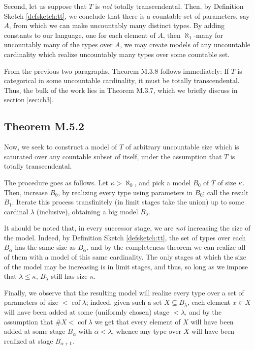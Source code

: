\documentclass{article}
\theoremstyle{nonumberplain}
\DeclareMathOperator{\cof}{cof}
\newcommand{\card}[1]{\#{#1}}
\begin{document}
Second, let us suppose that $T$ is \emph{not} totally transcendental. Then, by Definition Sketch \ref{defsketch:tt}, we conclude that there is a countable set of parameters, say $A$, from which we can make uncountably many distinct types. By adding constants to our language, one for each element of $A$, then $\aleph_1$-many for uncountably many of the types over $A$, we may create models of any uncountable cardinality which realize uncountably many types over some countable set.

From the previous two paragraphs, Theorem M.3.8 follows immediately: If $T$ is categorical in some uncountable cardinality, it must be totally transcendental. Thus, the bulk of the work lies in Theorem M.3.7, which we briefly discuss in section \ref{sec:ch3}.

\subsection{Theorem M.5.2}

Now, we seek to construct a model of $T$ of arbitrary uncountable size which is saturated over any countable subset of itself, under the assumption that $T$ is totally transcendental.

The procedure goes as follows. Let $\kappa > \aleph_0$, and pick a model $B_0$ of $T$ of size $\kappa$. Then, increase $B_0$, by realizing every type using parameters in $B_0$; call the result $B_1$. Iterate this process transfinitely (in limit stages take the union) up to some cardinal $\lambda$ (inclusive), obtaining a big model $B_\lambda$.

It should be noted that, in every successor stage, we are \emph{not} increasing the size of the model. Indeed, by Definition Sketch \ref{defsketch:tt}, the set of types over each $B_\alpha$ has the same size as $B_\alpha$, and by the completeness theorem we can realize all of them with a model of this same cardinality. The only stages at which the size of the model may be increasing is in limit stages, and thus, so long as we impose that $\lambda \leq \kappa$, $B_\lambda$ still has size $\kappa$.

Finally, we observe that the resulting model will realize every type over a set of parameters of size $<\cof\lambda$; indeed, given such a set $X \subseteq B_\lambda$, each element $x \in X$ will have been added at some (uniformly chosen) stage $<\lambda$, and by the assumption that $\card X < \cof \lambda$ we get that every element of $X$ will have been added at some stage $B_\alpha$ with $\alpha < \lambda$, whence any type over $X$ will have been realized at stage $B_{\alpha+1}$.
\end{document}
